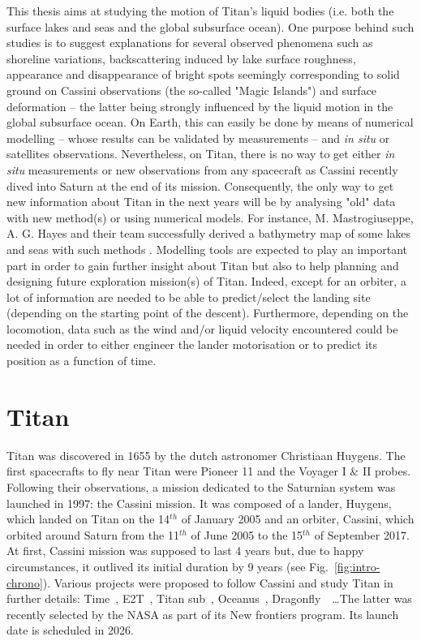 This thesis aims at studying the motion of Titan's liquid bodies (i.e. both the surface lakes and seas and the global subsurface ocean). One purpose behind such studies is to suggest explanations for several observed phenomena such as shoreline variations, backscattering induced by lake surface roughness, appearance and disappearance of bright spots seemingly corresponding to solid ground on Cassini observations (the so-called "Magic Islands") and surface deformation -- the latter being strongly influenced by the liquid motion in the global subsurface ocean. On Earth, this can easily be done by means of numerical modelling -- whose results can be validated by measurements -- and \textit{in situ} or satellites observations. Nevertheless, on Titan, there is no way to get either \textit{in situ} measurements or new observations from any spacecraft as Cassini recently dived into Saturn at the end of its mission. Consequently, the only way to get new information about Titan in the next years will be by analysing "old" data with new method(s) or using numerical models. For instance, M. Mastrogiuseppe, A. G. Hayes and their team successfully derived a bathymetry map of some lakes and seas with such methods \citep{hayes2016bathymetry, mastrogiuseppe2014bathymetry,mastrogiuseppe2016radar, mastrogiuseppe2018bathymetry}. Modelling tools are expected to play an important part in order to gain further insight about Titan but also to help planning and designing future exploration mission(s) of Titan. Indeed, except for an orbiter, a lot of information are needed to be able to predict/select the landing site (depending on the starting point of the descent). Furthermore, depending on the locomotion, data such as the wind and/or liquid velocity encountered could be needed in order to either engineer the lander motorisation or to predict its position as a function of time.

\section{Titan} 
Titan was discovered in 1655 by the dutch astronomer Christiaan Huygens. The first spacecrafts to fly near Titan were Pioneer 11 and the Voyager I $\&$ II probes. Following their observations, a mission dedicated to the Saturnian system was launched in 1997: the Cassini mission. It was composed of a lander, Huygens, which landed on Titan on the 14$^{th}$ of January 2005 and an orbiter, Cassini, which orbited around Saturn from the 11$^{th}$ of June 2005 to the 15$^{th}$ of September 2017. At first, Cassini mission was supposed to last 4 years but, due to happy circumstances, it outlived its initial duration by 9 years (see Fig.~\ref{fig:intro-chrono}). Various projects were proposed to follow Cassini and study Titan in further details: Time~\citep{lorenz2012winds}, E2T~\citep{mitri2014exploration}, Titan sub~\citep{hartwig2016exploring}, Oceanus~\citep{sotin2017oceanus}, Dragonfly~\citep{turtle2017dragonfly}~\dots The latter was recently selected by the NASA as part of its New frontiers program. Its launch date is scheduled in 2026.


